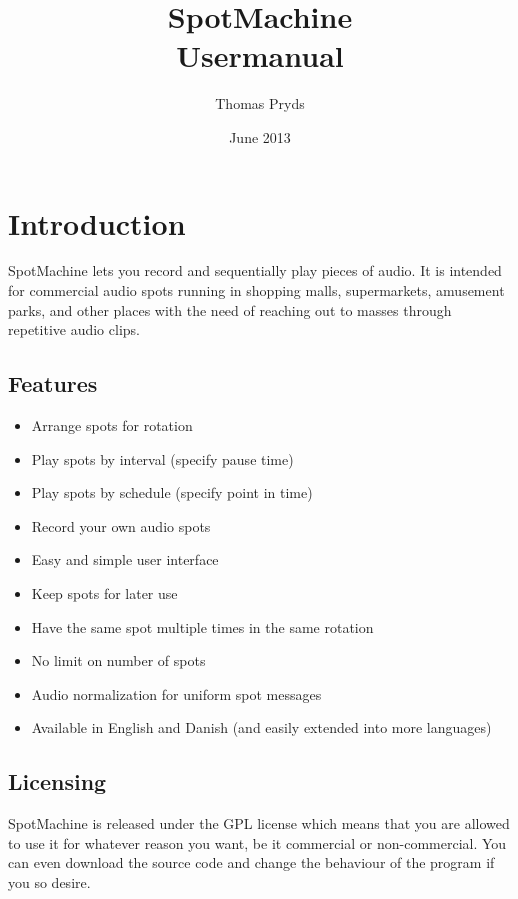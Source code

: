 \documentclass[a4paper,12pt]{report}
\begin{document}
\title{SpotMachine \\ Usermanual}
\author{Thomas Pryds}
\date{June 2013}

\maketitle

\tableofcontents

\chapter{Introduction}

SpotMachine lets you record and sequentially play pieces of audio. It is intended for commercial audio spots running in shopping malls, supermarkets, amusement parks, and other places with the need of reaching out to masses through repetitive audio clips.

\section{Features}
\begin{itemize}
\item Arrange spots for rotation
\item Play spots by interval (specify pause time)
\item Play spots by schedule (specify point in time)
\item Record your own audio spots
\item Easy and simple user interface
\item Keep spots for later use
\item Have the same spot multiple times in the same rotation
\item No limit on number of spots
\item Audio normalization for uniform spot messages
\item Available in English and Danish (and easily extended into more languages)
\end{itemize}

\section{Licensing}
SpotMachine is released under the GPL license which means that you are allowed to use it for whatever reason you want, be it commercial or non-commercial. You can even download the source code and change the behaviour of the program if you so desire.
\end{document}
